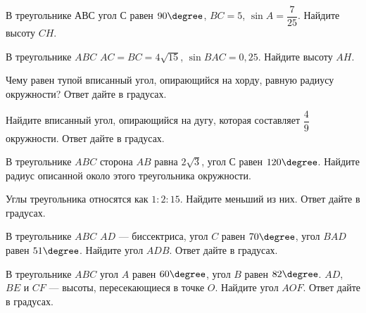 \begin{homework}[number=2]
	\begin{listofex}
		\item В треугольнике \( АВС \) угол \( С \) равен \( 90\degree \), \( BC = 5 \),  \( \sin A = \dfrac{7}{25} \).  Найдите высоту \( CH \).
		\item В треугольнике \( ABC \) \( AC = BC = 4\sqrt{15 }\),  \( \sin BAC = 0,25 \). Найдите высоту \( AH \).
		\item Чему равен тупой вписанный угол, опирающийся на хорду, равную радиусу окружности? Ответ дайте в градусах.
		\item Найдите вписанный угол, опирающийся на дугу, которая составляет \( \dfrac{4}{9} \) окружности. Ответ дайте в градусах.
		\item В треугольнике \( ABC \) сторона \( AB \) равна \( 2 \sqrt{3} \), угол \( С \) равен \( 120\degree \). Найдите радиус описанной около этого треугольника окружности.
		\item Углы треугольника относятся как \( 1:2:15 \). Найдите меньший из них. Ответ дайте в градусах.
		\item В треугольнике \( ABC \) \( AD \) --- биссектриса, угол \( C \) равен \( 70\degree \), угол \( BAD \) равен \( 51\degree \). Найдите угол \( ADB \). Ответ дайте в градусах.
		\item В треугольнике \( ABC \) угол \( A \) равен \( 60\degree \), угол \( B \) равен \( 82\degree \). \( AD \), \( BE \) и \( CF \) --- высоты, пересекающиеся в точке \( O \). Найдите угол \( AOF \). Ответ дайте в градусах.
	\end{listofex}
\end{homework}

